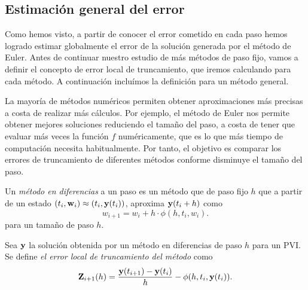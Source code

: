\subsection{Estimación general del error}

Como hemos visto, a partir de conocer el error cometido en cada paso
hemos logrado estimar globalmente
el error de la solución generada por el método de Euler.
Antes de continuar nuestro estudio de más métodos de paso fijo,
vamos a definir el concepto de error local de truncamiento,
que iremos calculando para cada método.
A continuación incluímos la definición para un método general.



La mayoría de métodos numéricos permiten obtener aproximaciones más precisas
a costa de realizar más cálculos.
Por ejemplo, el método de Euler nos permite
obtener mejores soluciones reduciendo el tamaño del paso,
a costa de tener que evaluar más veces la función $f$ numéricamente,
que es lo que más tiempo de computación necesita habitualmente.
Por tanto, el objetivo es
comparar los errores de truncamiento de diferentes métodos
conforme disminuye el tamaño del paso.

\begin{definition}
    Un \emph{método en diferencias} a un paso es un método que de paso fijo $h$
    que a partir de un estado $(t_i, \vb{w}_i) \approx (t_i, \vb{y}(t_i))$,
    aproxima $\vb{y}(t_i + h)$ como
    \begin{equation*}
        w_{i+1} = w_i + h\cdot \phi(h, t_i, w_i).
    \end{equation*}
    para un tamaño de paso $h$.
\end{definition}

\begin{definition}
    Sea $\vb{y}$ la solución obtenida por un método en diferencias de paso $h$
    para un PVI.
    Se define \emph{el error local de truncamiento del método} como
    \begin{equation*}
        \vb{Z}_{i+1}(h) =
        \frac{\vb{y}(t_{i+1}) - \vb{y}(t_i)}{h} - \phi(h, t_i, \vb{y}(t_i)).
    \end{equation*}
\end{definition}

